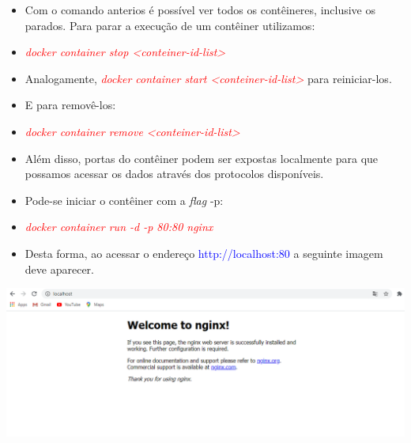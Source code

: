 \documentclass[10pt]{beamer}
\theoremstyle{remark}
\theoremstyle{definition}
\newcommand{\code}[1]{\textcolor{red} {\textit{#1}}} %
\begin{document}
\begin{frame}[allowframebreaks]
	\begin{itemize}
		\item Com o comando anterios é possível ver todos os contêineres, inclusive os parados. Para parar a execução de um contêiner utilizamos:
		
		\item \code{docker container stop <conteiner-id-list>}
		
		\item Analogamente, \code{docker container start <conteiner-id-list>} para reiniciar-los.
		
		\item E para removê-los:
		
		\item \code{docker container remove <conteiner-id-list>}
	\end{itemize}	
		
	\framebreak
	
	\begin{itemize}
		\item Além disso, portas do contêiner podem ser expostas localmente para que possamos acessar os dados através dos protocolos disponíveis.
		
		\item Pode-se iniciar o contêiner com a \textit{flag} -p:
		
		\item \code{docker container run -d -p 80:80 nginx}
	\end{itemize}
		
	\framebreak
		
	\begin{itemize}
		\item Desta forma, ao acessar o endereço \textcolor{blue}{http://localhost:80} a seguinte imagem deve aparecer.
	\end{itemize}		
		
	\begin{center}
		\includegraphics[width=1\textwidth]{images/13.png}
	\end{center}
	
\end{frame}
\end{document}
